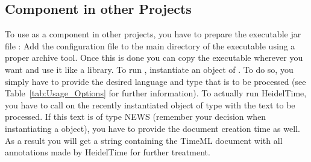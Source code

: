 \subsection{Component in other Projects}\label{sec:Usage_Component}
To use \product{} as a component in other projects, you have to prepare the executable jar file \executableFile{}: Add the configuration file \configFile{} to the main directory of the executable using a proper archive tool. Once this is done you can copy the executable wherever you want and use it like a library. To run \product{}, instantiate an object of . To do so, you simply have to provide the desired language and type that is to be processed (see Table~\ref{tab:Usage_Options} for further information). To actually run HeidelTime, you have to call  on the recently instantiated object of type  with the text to be processed. If this text is of type NEWS (remember your decision when instantiating a  object), you have to provide the document creation time as well. As a result you will get a string containing the TimeML document with all annotations made by HeidelTime for further treatment.
